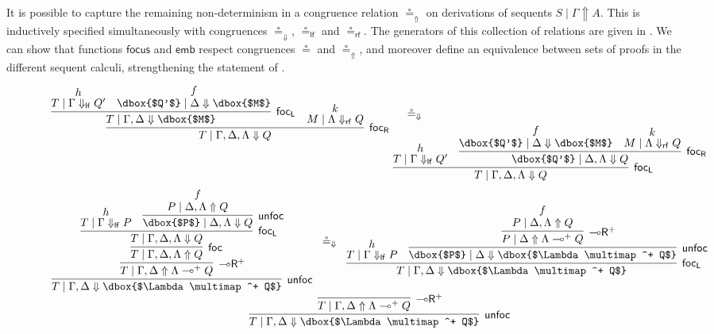 \documentclass[runningheads]{llncs}
\newcommand{\lright}{{\multimap}\mathsf{R}}
\newcommand{\lolliR}{\lright}
\newcommand{\lolli}{\multimap}
\newcommand{\lf}{\dn_\mathsf{lf}}%
\newcommand{\rf}{\dn_\mathsf{rf}}%
\newcommand{\proofbox}[1]{\begin{tabular}{l} #1 \end{tabular}}
\newcommand{\up}{\Uparrow}
\newcommand{\dn}{\Downarrow}
\newcommand{\focL}{\mathsf{foc_L}}
\newcommand{\foc}{\mathsf{foc}}
\newcommand{\focR}{\mathsf{foc_R}}
\newcommand{\unfoc}{\mathsf{unfoc}}
\newcommand{\focus}{\mathsf{focus}}
\newcommand{\emb}{\mathsf{emb}}
\begin{document}
It is possible to capture the remaining non-determinism in a congruence relation $\circeq_\up$ on derivations of sequents $S \mid \Gamma \up A$. This is inductively specified simultaneously with congruences $\circeq_\dn$, $\circeq_\mathsf{lf}$ and $\circeq_\mathsf{rf}$. The generators of this collection of relations are given in . We can show that functions $\focus$ and $\emb$ respect congruences $\circeq$ and $\circeq_\up$, and moreover define an equivalence between sets of proofs in the different sequent calculi, strengthening the statement of .
\begin{figure}[hbpt]
\scriptsize 
\[
\begin{array}{rcl}
\proofbox{
  \infer[\focR]{T \mid \Gamma,\Delta,\Lambda \dn Q}{    
    \infer[\focL]{T \mid \Gamma,\Delta \dn \dbox{$M$}}{
      \deduce{T \mid \Gamma \lf Q'}{h} &
      \deduce{\dbox{$Q'$} \mid \Delta \dn \dbox{$M$}}{f}      
    }
    &
    \deduce{M \mid \Lambda \rf Q}{k}
  }
}   & \circeq_\dn 
\\[-15pt] &&
\hspace{-42pt}
\proofbox{
\infer[\focL]{T \mid \Gamma,\Delta,\Lambda \dn Q}{
    \deduce{T \mid \Gamma \lf Q'}{h} &
    \infer[\focR]{\dbox{$Q'$} \mid \Delta,\Lambda \dn Q}{
      \deduce{\dbox{$Q'$} \mid \Delta \dn \dbox{$M$}}{f} &
      \deduce{M \mid \Lambda \rf Q}{k}
    }
  }
}
\end{array}
\]
\[
\begin{array}{c}
\proofbox{
  \infer[\unfoc]{T \mid \Gamma,\Delta \dn \dbox{$\Lambda \lolli^+ Q$}}{
    \infer[\lolliR^+]{T \mid \Gamma,\Delta \up \Lambda \lolli^+ Q}{
      \infer[\foc]{T \mid \Gamma,\Delta,\Lambda \up Q}{
        \infer[\focL]{T \mid \Gamma , \Delta,\Lambda \dn Q}{
          \deduce{T \mid \Gamma \lf P}{h} &
          \infer[\unfoc]{\dbox{$P$} \mid \Delta,\Lambda \dn Q}{
            \deduce{P \mid \Delta,\Lambda \up Q}{f}
          }
        }
      }
    }
  }
} \circeq_\dn 
\proofbox{
  \infer[\focL]{T \mid \Gamma,\Delta \dn \dbox{$\Lambda \lolli^+ Q$}}{
    \deduce{T \mid \Gamma \lf P}{h} &
    \infer[\unfoc]{\dbox{$P$} \mid \Delta \dn \dbox{$\Lambda \lolli^+ Q$}}{
      \infer[\lolliR^+]{P \mid \Delta \up \Lambda \lolli^+ Q}{
        \deduce{P \mid \Delta,\Lambda \up Q}{f}
      }
    }
  }
}
\\[6pt]
\proofbox{
  \infer[\unfoc]{T \mid \Gamma,\Delta \dn \dbox{$\Lambda \lolli^+ Q$}}{
    \infer[\lolliR^+]{T \mid \Gamma,\Delta \up \Lambda \lolli^+ Q}{
}}}
\end{array}\]
\end{figure}
\end{document}
